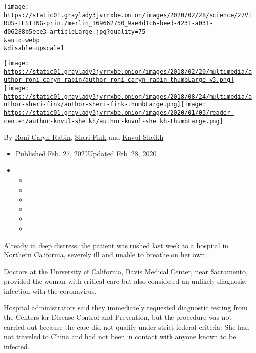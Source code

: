 \texttt{[image: https://static01.graylady3jvrrxbe.onion/images/2020/02/28/science/27VIRUS-TESTING-print/merlin\_169662750\_9ae4d1c6-beed-4231-a031-d06288b5ece3-articleLarge.jpg?quality=75\\\&auto=webp\\\&disable=upscale]}

\href{https://www.nytimes3xbfgragh.onion/by/roni-caryn-rabin}{\texttt{[image: https://static01.graylady3jvrrxbe.onion/images/2018/02/20/multimedia/author-roni-caryn-rabin/author-roni-caryn-rabin-thumbLarge-v3.png]}}\href{https://www.nytimes3xbfgragh.onion/by/sheri-fink}{\texttt{[image: https://static01.graylady3jvrrxbe.onion/images/2018/08/24/multimedia/author-sheri-fink/author-sheri-fink-thumbLarge.png]}}\href{https://www.nytimes3xbfgragh.onion/by/knvul-sheikh}{\texttt{[image: https://static01.graylady3jvrrxbe.onion/images/2020/01/03/reader-center/author-knvul-sheikh/author-knvul-sheikh-thumbLarge.png]}}

By \href{https://www.nytimes3xbfgragh.onion/by/roni-caryn-rabin}{Roni
Caryn Rabin},
\href{https://www.nytimes3xbfgragh.onion/by/sheri-fink}{Sheri Fink} and
\href{https://www.nytimes3xbfgragh.onion/by/knvul-sheikh}{Knvul Sheikh}

\begin{itemize}
\item
  Published Feb. 27, 2020Updated Feb. 28, 2020
\item
  \begin{itemize}
  \item
  \item
  \item
  \item
  \item
  \item
  \end{itemize}
\end{itemize}

Already in deep distress, the patient was rushed last week to a hospital
in Northern California, severely ill and unable to breathe on her own.

Doctors at the University of California, Davis Medical Center, near
Sacramento, provided the woman with critical care but also considered an
unlikely diagnosis: infection with the coronavirus.

Hospital administrators said they immediately requested diagnostic
testing from the Centers for Disease Control and Prevention, but the
procedure was not carried out because the case did not qualify under
strict federal criteria: She had not traveled to China and had not been
in contact with anyone known to be infected.


